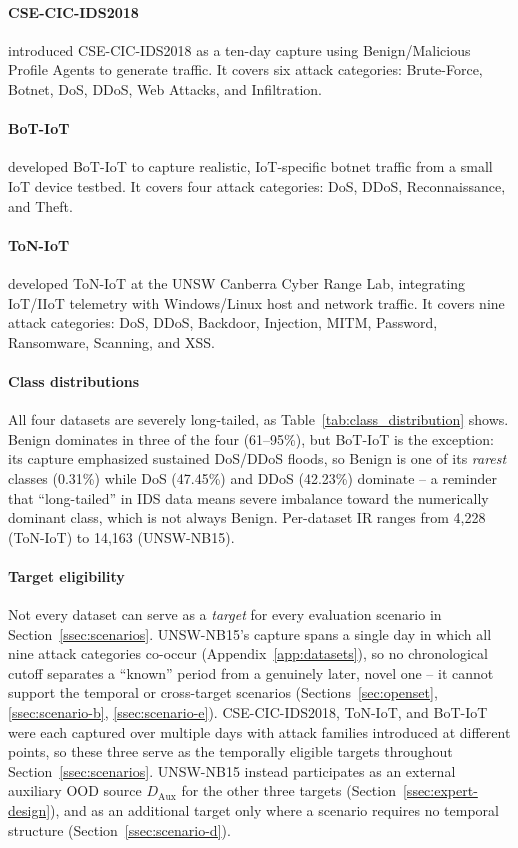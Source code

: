 \documentclass[sigconf]{acmart}
\begin{document}
\paragraph{CSE-CIC-IDS2018} \cite{sharafaldin2018toward} introduced CSE-CIC-IDS2018 as a ten-day capture using Benign/Malicious Profile Agents to generate traffic. It covers six attack categories: Brute-Force, Botnet, DoS, DDoS, Web Attacks, and Infiltration.

\paragraph{BoT-IoT} \citep{koroniotis_botiot_2019} developed BoT-IoT to capture realistic, IoT-specific botnet traffic from a small IoT device testbed. It covers four attack categories: DoS, DDoS, Reconnaissance, and Theft.

\paragraph{ToN-IoT} \citep{moustafa_toniot_2021} developed ToN-IoT at the UNSW Canberra Cyber Range Lab, integrating IoT/IIoT telemetry with Windows/Linux host and network traffic. It covers nine attack categories: DoS, DDoS, Backdoor, Injection, MITM, Password, Ransomware, Scanning, and XSS.

\paragraph{Class distributions} All four datasets are severely long-tailed, as Table~\ref{tab:class_distribution} shows. Benign dominates in three of the four (61--95\%), but BoT-IoT is the exception: its capture emphasized sustained DoS/DDoS floods, so Benign is one of its \textit{rarest} classes (0.31\%) while DoS (47.45\%) and DDoS (42.23\%) dominate -- a reminder that ``long-tailed'' in IDS data means severe imbalance toward the numerically dominant class, which is not always Benign. Per-dataset IR ranges from 4,228 (ToN-IoT) to 14,163 (UNSW-NB15).

\paragraph{Target eligibility} Not every dataset can serve as a \emph{target} for every evaluation scenario in Section~\ref{ssec:scenarios}. UNSW-NB15's capture spans a single day in which all nine attack categories co-occur (Appendix~\ref{app:datasets}), so no chronological cutoff separates a ``known'' period from a genuinely later, novel one -- it cannot support the temporal or cross-target scenarios (Sections~\ref{sec:openset}, \ref{ssec:scenario-b}, \ref{ssec:scenario-e}). CSE-CIC-IDS2018, ToN-IoT, and BoT-IoT were each captured over multiple days with attack families introduced at different points, so these three serve as the temporally eligible targets throughout Section~\ref{ssec:scenarios}. UNSW-NB15 instead participates as an external auxiliary OOD source $D_{\mathrm{Aux}}$ for the other three targets (Section~\ref{ssec:expert-design}), and as an additional target only where a scenario requires no temporal structure (Section~\ref{ssec:scenario-d}).
\end{document}
